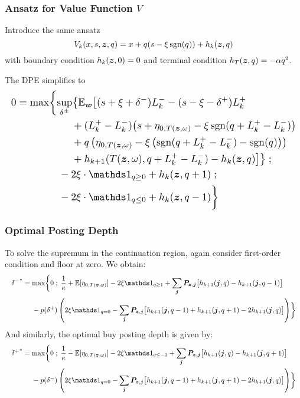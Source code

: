\begin{frame}
\frametitle{Ansatz for Value Function $V$}
Introduce the same ansatz
\[ V_k (x,s,\bm{z},q) = x + q(s-\xi\operatorname{\mathrm{sgn}}(q)) + h_k(\bm{z},q) \]
with boundary condition $h_k(\bm{z},0) = 0$ and terminal condition $h_T(\bm{z},q) = -\alpha q^2$. 

The DPE simplifies to
\[
\resizebox{\textwidth}{!}{$\displaystyle
\begin{aligned}
0 & = \max \biggl\lbrace 
\sup_{\delta^\pm} \bigl\lbrace \E_{\bw} \bigl[
(s + \xi + \delta^-)L_k^- - (s - \xi - \delta^+)L_k^+ \\
& \hphantom{\sup_{\bu} \biggl\lbrace \E_{\bw} \biggl[ {}+{}} + (L_k^+ - L_k^-) \bigl( s + \eta_{0,T(\bz, \omega)}  -\xi\sgn( q + L_k^+ - L_k^-)   \bigr) \\
& \hphantom{\sup_{\bu} \biggl\lbrace \E_{\bw} \biggl[ {}+{}} + q\left( \eta_{0,T(\bz, \omega)}  -\xi \left( \sgn( q + L_k^+ - L_k^-) - \sgn(q) \right) \right) \\
& \hphantom{\sup_{\bu} \biggl\lbrace \E_{\bw} \biggl[ {}+{}} + h_{k+1}(T(\bz,\omega), q + L_k^+ - L_k^- ) -  h_k(\bz,q) \bigr] \bigr\rbrace \; ;\\
& \hphantom{{}={} \max \biggl\lbrace } -2\xi \cdot \indicator_{q \geq 0} + h_k(\bz,q+1) \; ; \\
& \hphantom{{}={} \max \biggl\lbrace } -2\xi \cdot \indicator_{q \leq 0} + h_k(\bz,q-1) \biggr\rbrace
\end{aligned}
$}
\]
\end{frame}

\begin{frame}
\frametitle{Optimal Posting Depth}
To solve the supremum in the continuation region, again consider first-order condition and floor at zero. We obtain:
\[
\resizebox{\textwidth}{!}{$\displaystyle
\begin{aligned}
{\delta^-}^* & = \max \biggl\lbrace 0 \; ; \; \frac{1}{\kappa} + \E[\eta_{0,T(\bz, \omega)}] - 2 \xi \indicator_{q \geq 1} + \sum_{\bj} \bP_{\bz,\bj} \bigl[ h_{k+1}(\bj, q) - h_{k+1}(\bj, q-1) \bigr] \\
& \hphantom{{}={}} -p(\delta^+) \left( 2 \xi \indicator_{q = 0} - \sum_{\bj} \bP_{\bz,\bj} \bigl[ h_{k+1}(\bj, q-1) + h_{k+1}(\bj, q+1) -2 h_{k+1}(\bj, q)  \bigr] \right) \biggr\rbrace
\end{aligned}
$}
\]
And similarly, the optimal buy posting depth is given by:
\[
\resizebox{\textwidth}{!}{$\displaystyle 
\begin{aligned}
{\delta^+}^* & = \max \biggl\lbrace 0 \; ; \; \frac{1}{\kappa} - \E[\eta_{0,T(\bz, \omega)}] - 2 \xi \indicator_{q \leq -1} + \sum_{\bj} \bP_{\bz,\bj} \bigl[ h_{k+1}(\bj, q) - h_{k+1}(\bj, q+1) \bigr] \\
& \hphantom{{}={}} -p(\delta^-) \left( 2 \xi \indicator_{q = 0} - \sum_{\bj} \bP_{\bz,\bj} \bigl[ h_{k+1}(\bj, q-1) + h_{k+1}(\bj, q+1) -2 h_{k+1}(\bj, q)  \bigr] \right) \biggr\rbrace
\end{aligned}
$}
\]
\end{frame}

